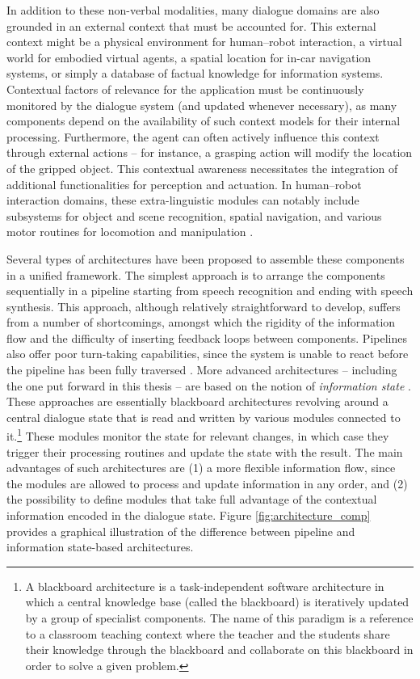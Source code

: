 In addition to these non-verbal modalities, many dialogue domains are also grounded in an external context that must be accounted for.  This external context might be a physical environment for human--robot interaction, a virtual world for embodied virtual agents, a spatial location for in-car navigation systems, or simply a database of factual knowledge for information systems. Contextual factors of relevance for the application must be continuously monitored by the dialogue system (and updated whenever necessary), as many components depend on the availability of such context models for their internal processing.  Furthermore, the agent can often actively influence this context through external actions -- for instance, a grasping action will modify the location of the gripped object.   This contextual awareness necessitates the integration of additional functionalities for perception and actuation. In human--robot interaction domains, these extra-linguistic modules can notably include subsystems for object and scene recognition, spatial navigation, and various motor routines for locomotion and manipulation  \citep{1570637,goodrich2007human,HawesSWZJKBBS07}. 

Several types of architectures have been proposed to assemble these components in a unified framework.  The simplest approach is to arrange the components sequentially in a pipeline starting from speech recognition and ending with speech synthesis.  This approach, although relatively straightforward to develop, suffers from a number of shortcomings, amongst which the rigidity of the information flow and the difficulty of inserting feedback loops between components. Pipelines also offer poor turn-taking capabilities, since the system is unable to react before the pipeline has been fully traversed \citep{RauxE09}. More advanced architectures -- including the one put forward in this thesis -- are based on the notion of \textit{information state} \citep{Larsson:2000,Bos2003}.  These approaches are essentially blackboard architectures revolving around a central dialogue state that is read and written by various modules connected to it.\footnote{A blackboard architecture is a task-independent software architecture in which a central knowledge base (called the blackboard) is iteratively updated by a group of specialist components. The name of this paradigm is a reference to a classroom teaching context where the teacher and the students share their knowledge through the blackboard and collaborate on this blackboard in order to solve a given problem.} These modules monitor the state for relevant changes, in which case they trigger their processing routines and update the state with the result.  The main advantages of such architectures are (1) a more flexible information flow, since the modules are allowed to process and update information in any order, and (2) the possibility to define modules that take full advantage of the contextual information encoded in the dialogue state.  Figure \ref{fig:architecture_comp} provides a graphical illustration of the difference between pipeline and information state-based architectures.  

